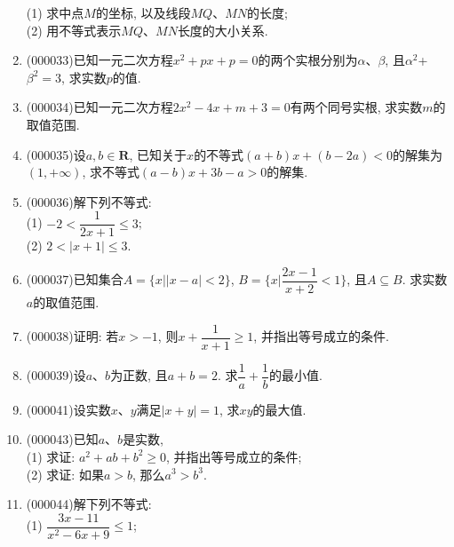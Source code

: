 \documentclass[10pt,a4paper]{article}
\begin{document}
\begin{enumerate}[1.]
(1) 求中点$M$的坐标, 以及线段$MQ$、$MN$的长度;\\
(2) 用不等式表示$MQ$、$MN$长度的大小关系.
\begin{center}
\end{center}
\item {\tiny (000033)}已知一元二次方程$x^2+px+p=0$的两个实根分别为$\alpha$、$\beta$, 且$\alpha^2$+$\beta^2=3$, 求实数$p$的值.
\item {\tiny (000034)}已知一元二次方程$2x^2-4x+m+3=0$有两个同号实根, 求实数$m$的取值范围.
\item {\tiny (000035)}设$a,b\in \mathbf{R}$, 已知关于$x$的不等式$(a+b)x+(b-2a)<0$的解集为$(1, +\infty)$, 求不等式$(a-b)x+3b-a>0$的解集.
\item {\tiny (000036)}解下列不等式:\\
(1) $-2< \dfrac 1{2x+1}\le 3$;\\
(2) $2<|x+1|\le 3$.
\item {\tiny (000037)}已知集合$A=\{x||x-a|<2\}$, $B=\{x|\dfrac{2x-1}{x+2}<1\}$, 且$A\subseteq B$. 求实数$a$的取值范围.
\item {\tiny (000038)}证明: 若$x>-1$, 则$x+\dfrac 1{x+1}\ge 1$, 并指出等号成立的条件.
\item {\tiny (000039)}设$a$、$b$为正数, 且$a+b=2$. 求$\dfrac 1a+\dfrac 1b$的最小值.
\item {\tiny (000041)}设实数$x$、$y$满足$|x+y|=1$, 求$xy$的最大值.
\item {\tiny (000043)}已知$a$、$b$是实数,\\
(1) 求证: $a^2+ab+b^2\ge 0$, 并指出等号成立的条件;\\
(2) 求证: 如果$a>b$, 那么$a^3>b^3$.
\item {\tiny (000044)}解下列不等式:\\
(1) $\dfrac{3x-11}{x^2-6x+9}\le 1$;\\

\end{enumerate}
\end{document}
